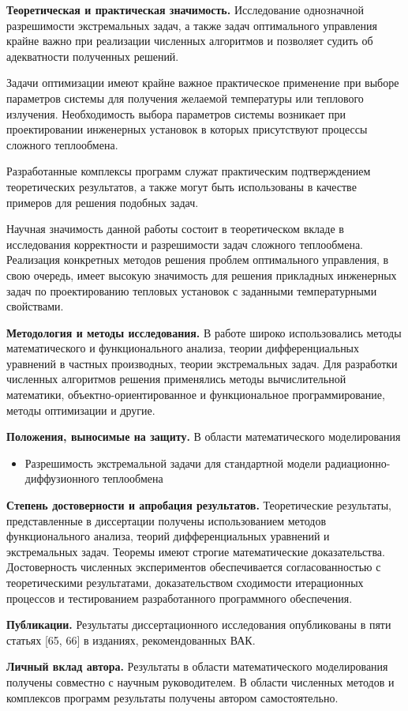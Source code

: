 \textbf{Теоретическая и практическая значимость.}
Исследование однозначной разрешимости экстремальных задач, а также задач оптимального
управления крайне важно при реализации численных алгоритмов и позволяет судить об адекватности полученных решений.

Задачи оптимизации имеют крайне важное практическое применение при выборе параметров системы для
получения желаемой температуры или теплового излучения.
Необходимость выбора параметров системы возникает при проектировании инженерных установок
в которых присутствуют процессы сложного теплообмена.

Разработанные комплексы программ служат практическим подтверждением теоретических результатов,
а также могут быть использованы в качестве примеров для решения подобных задач.


Научная значимость данной работы состоит в теоретическом вкладе в исследования корректности и
разрешимости задач сложного теплообмена.
Реализация конкретных методов решения проблем оптимального управления, в свою очередь, имеет высокую
значимость для решения прикладных инженерных задач по проектированию тепловых установок с
заданными температурными свойствами.


\textbf{Методология и методы исследования.}
В работе широко использовались методы математического и функционального анализа, теории дифференциальных
уравнений в частных производных, теории экстремальных задач.
Для разработки численных алгоритмов решения применялись методы вычислительной математики,
объектно-ориентированное и функциональное программирование, методы оптимизации и другие.


\textbf{Положения, выносимые на защиту.}
В области математического моделирования
\begin{itemize}
    \item Разрешимость экстремальной задачи для стандартной модели радиационно-диффузионного теплообмена
\end{itemize}


\textbf{Степень достоверности и апробация результатов.}
Теоретические результаты, представленные в диссертации получены использованием методов функционального анализа, теорий
дифференциальных уравнений и экстремальных задач.
Теоремы имеют строгие математические доказательства.
Достоверность численных экспериментов обеспечивается согласованностью с теоретическими результатами, доказательством
сходимости итерационных процессов и тестированием разработанного программного обеспечения.

\textbf{Публикации.}
Результаты диссертационного исследования опубликованы в пяти статьях [65, 66] в изданиях, рекомендованных ВАК.


\textbf{Личный вклад автора.}
Результаты в области математического моделирования получены совместно с научным руководителем.
В области численных методов и комплексов программ результаты получены автором самостоятельно.
